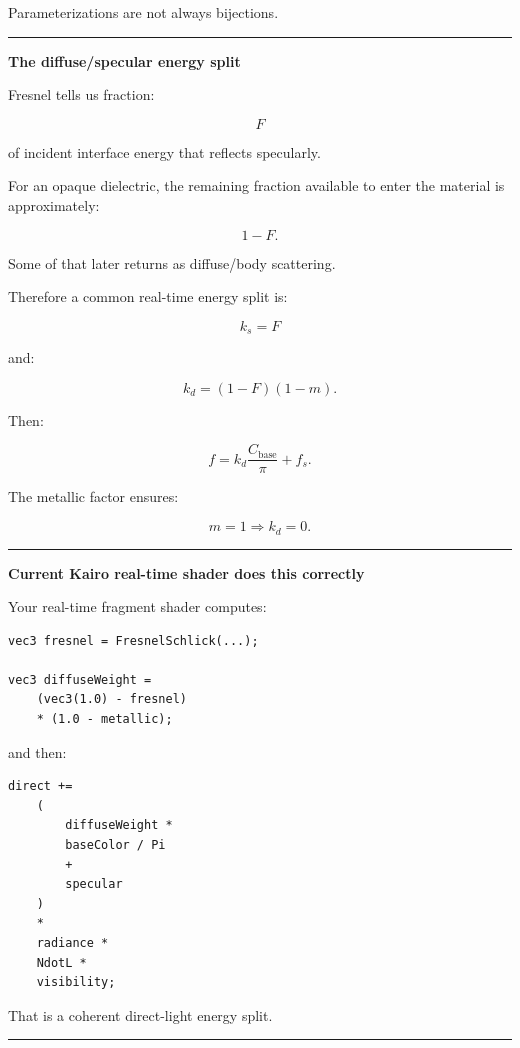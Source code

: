 Parameterizations are not always bijections.

\begin{center}\rule{0.5\linewidth}{0.5pt}\end{center}

\textbf{The diffuse/specular energy split}

Fresnel tells us fraction:

\[
F
\]

of incident interface energy that reflects specularly.

For an opaque dielectric, the remaining fraction available to enter the material is approximately:

\[
1-F.
\]

Some of that later returns as diffuse/body scattering.

Therefore a common real-time energy split is:

\[
\boxed{
k_s=F
}
\]

and:

\[
\boxed{
k_d=(1-F)(1-m).
}
\]

Then:

\[
f=
k_d\frac{C_{\text{base}}}{\pi}
+
f_s.
\]

The metallic factor ensures:

\[
m=1
\Rightarrow
k_d=0.
\]

\begin{center}\rule{0.5\linewidth}{0.5pt}\end{center}

\textbf{Current Kairo real-time shader does this correctly}

Your real-time fragment shader computes:

\begin{verbatim}
vec3 fresnel = FresnelSchlick(...);

vec3 diffuseWeight =
    (vec3(1.0) - fresnel)
    * (1.0 - metallic);
\end{verbatim}

and then:

\begin{verbatim}
direct +=
    (
        diffuseWeight *
        baseColor / Pi
        +
        specular
    )
    *
    radiance *
    NdotL *
    visibility;
\end{verbatim}

That is a coherent direct-light energy split.

\begin{center}\rule{0.5\linewidth}{0.5pt}\end{center}

